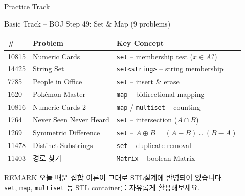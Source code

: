 \documentclass{beamer}
\begin{document}
\begin{frame}[t,shrink=5]{Practice Track}
    \small
    \vspace{0.1cm}

    \begin{exampleblock}{Basic Track -- BOJ Step 49: Set \& Map (9 problems)}
        \footnotesize
        \renewcommand{\arraystretch}{1.2}
        \begin{tabular}{lll}
            \toprule
            \textbf{\#} & \textbf{Problem} & \textbf{Key Concept} \\
            \midrule
            10815 & Numeric Cards & \texttt{set} -- membership test ($x \in A$?) \\
            14425 & String Set & \texttt{set<string>} -- string membership \\
            7785 & People in Office & \texttt{set} -- insert \& erase \\
            1620 & Pok\'{e}mon Master & \texttt{map} -- bidirectional mapping \\
            10816 & Numeric Cards 2 & \texttt{map} / \texttt{multiset} -- counting \\
            1764 & Never Seen Never Heard & \texttt{set} -- intersection ($A \cap B$) \\
            1269 & Symmetric Difference & \texttt{set} -- $A \oplus B = (A-B) \cup (B-A)$ \\
            11478 & Distinct Substrings & \texttt{set} -- duplicate removal \\
            11403 &경로 찾기 & \texttt{Matrix} -- boolean Matrix \\ 
            \bottomrule
        \end{tabular}
        \renewcommand{\arraystretch}{1}
    \end{exampleblock}

    \vspace{0.08cm}
    \begin{alertblock}{REMARK}
        \footnotesize
        오늘 배운 집합 이론이 그대로 STL설계에 반영되어 있습니다.\\
        \texttt{set}, \texttt{map}, \texttt{multiset} 등 STL container를 자유롭게 활용해보세요.
    \end{alertblock}
\end{frame}
\end{document}
